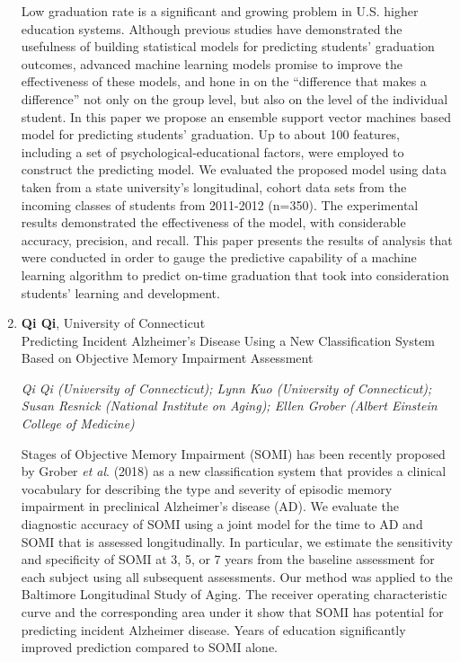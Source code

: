 \begin{enumerate}
Low graduation rate is a significant and growing problem in U.S. higher education systems. Although previous studies have demonstrated the usefulness of building statistical models for predicting students’ graduation outcomes, advanced machine learning models promise to improve the effectiveness of these models, and hone in on the “difference that makes a difference” not only on the group level, but also on the level of the individual student. In this paper we propose an ensemble support vector machines based model for predicting students’ graduation. Up to about 100 features, including a set of psychological-educational factors, were employed to construct the predicting model. We evaluated the proposed model using data taken from a state university’s longitudinal, cohort data sets from the incoming classes of students from 2011-2012 (n=350). The experimental results demonstrated the effectiveness of the model, with considerable accuracy, precision, and recall. This paper presents the results of analysis that were conducted in order to gauge the predictive capability of a machine learning algorithm to predict on-time graduation that took into consideration students’ learning and development.

\item \textbf{Qi Qi}, University of Connecticut \\
Predicting Incident Alzheimer's Disease Using a New Classification System Based on Objective Memory Impairment Assessment

\emph{\footnotesize Qi Qi (University of Connecticut); Lynn Kuo (University of Connecticut); Susan Resnick (National Institute on Aging); Ellen Grober (Albert Einstein College of Medicine)}

Stages of Objective Memory Impairment (SOMI) has been recently proposed by Grober \textit{et al}. (2018) as a new classification system that provides a clinical vocabulary for describing the type and severity of episodic memory impairment in preclinical Alzheimer's disease (AD). We evaluate the diagnostic accuracy of SOMI using a joint model for the time to AD and SOMI that is assessed longitudinally. In particular, we estimate the sensitivity and specificity of SOMI at 3, 5, or 7 years from the baseline assessment for each subject using all subsequent assessments. Our method was applied to the Baltimore Longitudinal Study of Aging. The receiver operating characteristic curve and the corresponding area under it show that SOMI has potential for predicting incident Alzheimer disease. Years of education significantly improved prediction compared to SOMI alone.


\end{enumerate}
